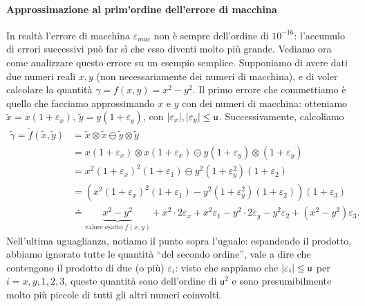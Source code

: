 \documentclass[a4paper]{report}
\DeclarePairedDelimiter{\abs}{\lvert}{\rvert}
\theoremstyle{definiton}
\theoremstyle{remark}
\begin{document}
\paragraph{Approssimazione al prim'ordine dell'errore di macchina}
In realtà l'errore di macchina $\varepsilon_{mac}$ non è sempre dell'ordine di $10^{-16}$: l'accumulo di errori successivi può far sì che esso diventi molto più grande. Vediamo ora come analizzare questo errore su un esempio semplice. Supponiamo di avere dati due numeri reali $x,y$ (non necessariamente dei numeri di macchina), e di voler calcolare la quantità $\gamma = f(x,y) = x^2 - y^2$. Il primo errore che commettiamo è quello che facciamo approssimando $x$ e $y$ con dei numeri di macchina: otteniamo $\tilde{x} = x(1+\varepsilon_x)$, $\tilde{y} = y(1+\varepsilon_y)$, con $\abs{\varepsilon_x},\abs{\varepsilon_y} \leq \mathsf{u}$. Successivamente, calcoliamo
\begin{align*}
\tilde{\gamma} = \tilde{f}(\tilde{x}, \tilde{y}) &= \tilde{x} \otimes \tilde{x} \ominus \tilde{y} \otimes \tilde{y} \\
&= x(1+\varepsilon_x) \otimes x(1+\varepsilon_x) \ominus y(1+\varepsilon_y) \otimes (1+\varepsilon_y)\\
&= x^2(1+\varepsilon_x)^2(1+\varepsilon_1) \ominus y^2(1+\varepsilon_y^2)(1+\varepsilon_2)\\
&= \left( x^2(1+\varepsilon_x)^2(1+\varepsilon_1) - y^2(1+\varepsilon_y^2)(1+\varepsilon_2) \right)(1+\varepsilon_3) \\
& \doteq \underbrace{x^2-y^2}_{\text{valore esatto $f(x,y)$}} {}+{} x^2 \cdot 2\varepsilon_x + x^2 \varepsilon_1 - y^2 \cdot 2\varepsilon_y - y^2\varepsilon_2 + (x^2-y^2)\varepsilon_3.
\end{align*}
Nell'ultima uguaglianza, notiamo il punto sopra l'uguale: espandendo il prodotto, abbiamo ignorato tutte le quantità ``del secondo ordine'', vale a dire che contengono il prodotto di due (o più) $\varepsilon_i$: visto che sappiamo che $\abs{\varepsilon_i} \leq \mathsf{u}$ per $i=x,y,1,2,3$, queste quantità sono dell'ordine di $\mathsf{u}^2$ e sono presumibilmente molto più piccole di tutti gli altri numeri coinvolti.
\end{document}
